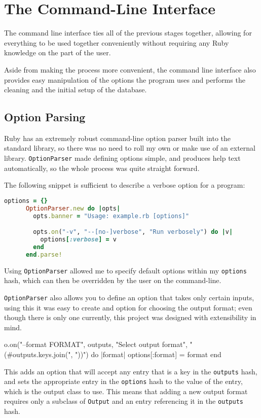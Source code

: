 \section{The Command-Line Interface}
The command line interface ties all of the previous stages together, allowing
for everything to be used together conveniently without requiring any Ruby
knowledge on the part of the user.

Aside from making the process more convenient, the command line interface also
provides easy manipulation of the options the program uses and performs the
cleaning and the initial setup of the database.

  \subsection{Option Parsing}
    Ruby has an extremely robust command-line option parser built into the
    standard library, so there was no need to roll my own or make use of an
    external library. \lstinline|OptionParser| made defining options simple, and
    produces help text automatically, so the whole process was quite straight
    forward.

    The following snippet is sufficient to describe a verbose option for a
    program:

    \begin{lstlisting}[language=ruby,gobble=6]
      options = {}
      OptionParser.new do |opts|
        opts.banner = "Usage: example.rb [options]"

        opts.on("-v", "--[no-]verbose", "Run verbosely") do |v|
          options[:verbose] = v
        end
      end.parse!
    \end{lstlisting}

    Using \lstinline|OptionParser| allowed me to specify default options within
    my \lstinline|options| hash, which can then be overridden by the user on the
    command-line.

    \lstinline|OptionParser| also allows you to define an option that takes only
    certain inputs, using this it was easy to create and option for choosing the
    output format; even though there is only one currently, this project was
    designed with extensibility in mind.

    \begin{code}[language=ruby, gobble=6]
      o.on("--format FORMAT", outputs, "Select output format",
           "  (#{outputs.keys.join(", ")})") do |format|
        options[:format] = format
      end
    \end{code}

    This adds an option that will accept any entry that is a key in the
    \lstinline|outputs| hash, and sets the appropriate entry in the
    \lstinline|options| hash to the value of the entry, which is the output
    class to use. This means that adding a new output format requires only a
    subclass of \lstinline|Output| and an entry referencing it in the
    \lstinline|outputs| hash.

